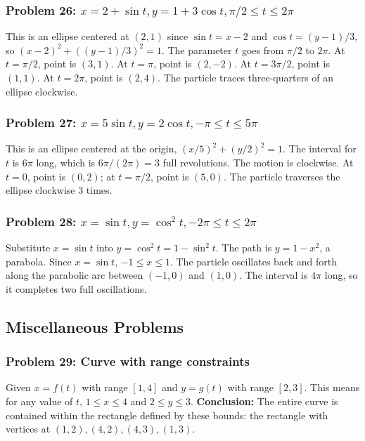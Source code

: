 \documentclass{article}
\begin{document}
\subsubsection{Problem 26: \(x=2+\sin t, y=1+3\cos t, \pi/2 \le t \le 2\pi\)}
This is an ellipse centered at \((2,1)\) since \(\sin t = x-2\) and \(\cos t = (y-1)/3\), so \((x-2)^2 + ((y-1)/3)^2 = 1\). The parameter \(t\) goes from \(\pi/2\) to \(2\pi\).
At \(t=\pi/2\), point is \((3,1)\). At \(t=\pi\), point is \((2,-2)\). At \(t=3\pi/2\), point is \((1,1)\). At \(t=2\pi\), point is \((2,4)\). The particle traces three-quarters of an ellipse clockwise.

\subsubsection{Problem 27: \(x=5\sin t, y=2\cos t, -\pi \le t \le 5\pi\)}
This is an ellipse centered at the origin, \((x/5)^2 + (y/2)^2 = 1\). The interval for \(t\) is \(6\pi\) long, which is \(6\pi / (2\pi) = 3\) full revolutions. The motion is clockwise. At \(t=0\), point is \((0,2)\); at \(t=\pi/2\), point is \((5,0)\). The particle traverses the ellipse clockwise 3 times.

\subsubsection{Problem 28: \(x=\sin t, y=\cos^2 t, -2\pi \le t \le 2\pi\)}
Substitute \(x=\sin t\) into \(y=\cos^2 t = 1-\sin^2 t\). The path is \(y=1-x^2\), a parabola. Since \(x=\sin t\), \(-1 \le x \le 1\). The particle oscillates back and forth along the parabolic arc between \((-1,0)\) and \((1,0)\). The interval is \(4\pi\) long, so it completes two full oscillations.

\subsection{Miscellaneous Problems}

\subsubsection{Problem 29: Curve with range constraints}
Given \(x=f(t)\) with range \([1,4]\) and \(y=g(t)\) with range \([2,3]\). This means for any value of \(t\), \(1 \le x \le 4\) and \(2 \le y \le 3\).
\textbf{Conclusion:} The entire curve is contained within the rectangle defined by these bounds: the rectangle with vertices at \((1,2), (4,2), (4,3), (1,3)\).
\end{document}
